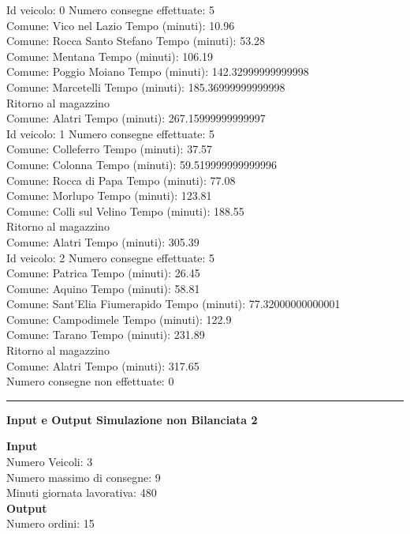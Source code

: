 \documentclass[a4paper,12pt]{report}
\begin{document}
Id veicolo: 0	Numero consegne effettuate: 5\\
Comune: Vico nel Lazio	 Tempo (minuti): 10.96\\
Comune: Rocca Santo Stefano	 Tempo (minuti): 53.28\\
Comune: Mentana	 Tempo (minuti): 106.19\\
Comune: Poggio Moiano	 Tempo (minuti): 142.32999999999998\\
Comune: Marcetelli	 Tempo (minuti): 185.36999999999998\\
Ritorno al magazzino\\
Comune: Alatri	 Tempo (minuti): 267.15999999999997\\

Id veicolo: 1	Numero consegne effettuate: 5\\
Comune: Colleferro	 Tempo (minuti): 37.57\\
Comune: Colonna	 Tempo (minuti): 59.519999999999996\\
Comune: Rocca di Papa	 Tempo (minuti): 77.08\\
Comune: Morlupo	 Tempo (minuti): 123.81\\
Comune: Colli sul Velino	 Tempo (minuti): 188.55\\
Ritorno al magazzino\\
Comune: Alatri	 Tempo (minuti): 305.39\\

Id veicolo: 2	Numero consegne effettuate: 5\\
Comune: Patrica	 Tempo (minuti): 26.45\\
Comune: Aquino	 Tempo (minuti): 58.81\\
Comune: Sant'Elia Fiumerapido	 Tempo (minuti): 77.32000000000001\\
Comune: Campodimele	 Tempo (minuti): 122.9\\
Comune: Tarano	 Tempo (minuti): 231.89\\
Ritorno al magazzino\\
Comune: Alatri	 Tempo (minuti): 317.65\\

Numero consegne non effettuate: 0\\
\hrule
\begin{center}
\textbf{Input e Output Simulazione non Bilanciata 2}
\end{center}
\textbf{Input}\\
Numero Veicoli: 3\\
Numero massimo di consegne: 9\\
Minuti giornata lavorativa: 480\\
\textbf{Output}\\
Numero ordini: 15\\
\end{document}
